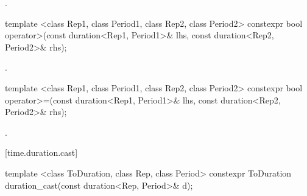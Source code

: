 \begin{itemdescr}
\pnum
\returns {}.
\end{itemdescr}

%
%
\begin{itemdecl}
template <class Rep1, class Period1, class Rep2, class Period2>
  constexpr bool operator>(const duration<Rep1, Period1>& lhs, const duration<Rep2, Period2>& rhs);
\end{itemdecl}

\begin{itemdescr}
\pnum
\returns {}.
\end{itemdescr}

%
%
\begin{itemdecl}
template <class Rep1, class Period1, class Rep2, class Period2>
  constexpr bool operator>=(const duration<Rep1, Period1>& lhs, const duration<Rep2, Period2>& rhs);
\end{itemdecl}

\begin{itemdescr}
\pnum
\returns {}.
\end{itemdescr}

[time.duration.cast]{}

%
%
\begin{itemdecl}
template <class ToDuration, class Rep, class Period>
  constexpr ToDuration duration_cast(const duration<Rep, Period>& d);
\end{itemdecl}

